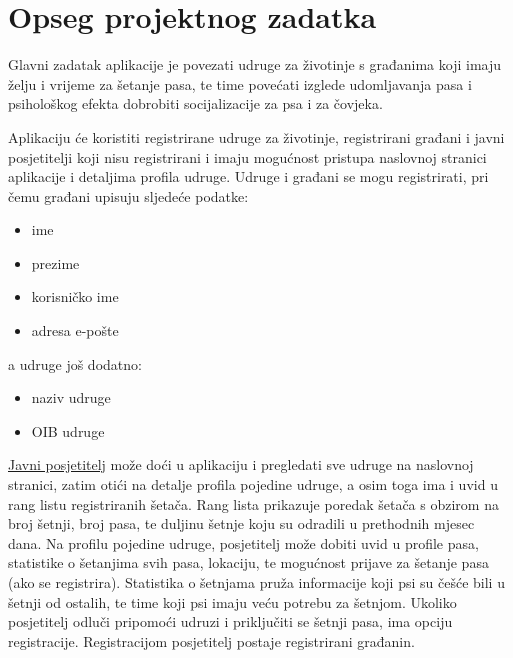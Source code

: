 	\section{Opseg projektnog zadatka}
	  \vspace{15pt}
		Glavni zadatak aplikacije je povezati udruge za životinje s građanima koji imaju
	želju i vrijeme za šetanje pasa, te time povećati izglede udomljavanja pasa i psihološkog
	efekta dobrobiti socijalizacije za psa i za čovjeka. \par \vspace{10pt}
	Aplikaciju će koristiti registrirane udruge za životinje, registrirani
	građani i javni posjetitelji koji nisu registrirani i imaju mogućnost
	pristupa naslovnoj stranici aplikacije i detaljima profila udruge.
	Udruge i građani se mogu registrirati, pri čemu građani upisuju sljedeće podatke:
	\begin{itemize}
		\item ime
		\item prezime
		\item korisničko ime
		\item adresa e-pošte
	\end{itemize} 
	a udruge još dodatno:
	\begin{itemize}
		\item naziv udruge
		\item OIB udruge
	\end{itemize}
	 \vspace{10pt}
	\underline{Javni posjetitelj} može doći u aplikaciju i
	pregledati sve udruge na naslovnoj stranici, zatim otići na detalje profila pojedine udruge,
	a osim toga ima i uvid u rang listu registriranih šetača.  Rang lista prikazuje poredak šetača
	s obzirom na broj šetnji, broj pasa, te duljinu šetnje koju su odradili u prethodnih mjesec
	dana.
	Na profilu pojedine udruge, posjetitelj može dobiti uvid u profile pasa,
	statistike o šetanjima svih pasa, lokaciju, te mogućnost prijave za šetanje pasa (ako se registrira). Statistika
	o šetnjama pruža informacije koji psi su češće bili u šetnji od ostalih, te time koji psi imaju
	veću potrebu za šetnjom.
	Ukoliko posjetitelj odluči pripomoći udruzi i priključiti se šetnji
	pasa, ima opciju registracije. Registracijom posjetitelj postaje registrirani građanin. 
	
	
	  \vspace{15pt} \par 
	  
